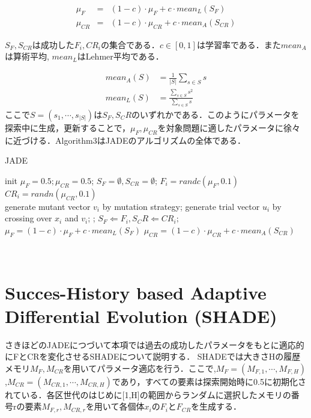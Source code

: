 \documentclass[a4paper,11pt,oneside,openany]{jsbook}
\begin{document}
\begin{eqnarray}
  \mu_F & = & (1 - c)\cdot\mu _F + c\cdot mean_L(S_F)\\
  \mu_{CR} & = & (1 - c)\cdot\mu _{CR} + c\cdot mean_A(S_{CR})
\end{eqnarray}

$S_F,S_{CR}$は成功した$F_i,CR_i$の集合である．$c\in[0,1]$は学習率である．また$mean_A$は算術平均, $mean_L$はLehmer平均である．

\begin{eqnarray}
  mean_A(S) & = \frac{1}{|S|}\sum_{s\in S}s \\
  mean_L(S) & = \frac{\sum_{s\in S}s^2}{\sum_{s\in S}s}
\end{eqnarray}
ここで$S=(s_1,\cdots, s_{|S|})$は$S_F,S_CR$のいずれかである．このようにパラメータを探索中に生成，更新することで，$\mu _F, \mu _{CR}$を対象問題に適したパラメータに徐々に近づける．Algorithm3はJADEのアルゴリズムの全体である．

\begin{algorithm}                      
\caption{JADE}         
\label{alg:pbnf}                          
\begin{algorithmic}  
\STATE init $\mu _F = 0.5; \mu _{CR} = 0.5$;
    \STATE $S_F = \emptyset, S_{CR} = \emptyset$;
        \STATE $F_i = randc(\mu _F, 0.1)$ \\
        \STATE $CR_i = randn(\mu _{CR}, 0.1)$ \\
        \STATE generate mutant vector {$v_i$} by mutation strategy;
        \STATE generate trial vector {$u_i$} by crossing over {$x_i$} and {$v_i$}; 
    \ENDFOR
            ;
            \STATE $S_F\Leftarrow {F_i}, S_CR \Leftarrow {CR_i};$
        \ENDIF
    \ENDFOR
        \STATE $\mu_F = (1 - c)\cdot\mu _F + c\cdot mean_L(S_F)$
        \STATE $\mu_{CR} = (1 - c)\cdot\mu _{CR} + c\cdot mean_A(S_{CR})$
    \ENDIF
\ENDWHILE
\end{algorithmic}
\end{algorithm}　

\section{Succes-History based Adaptive Differential Evolution (SHADE)}
さきほどのJADEにつづいて本項では過去の成功したパラメータをもとに適応的にFとCRを変化させるSHADEについて説明する．
SHADEでは大きさHの履歴メモリ$M_F,M_{CR}$を用いてパラメータ適応を行う．ここで,$M_F = (M_{F,1},\cdots,M_{F,H})$,$M_{CR}= (M_{CR,1},\cdots,M_{CR,H})$であり，すべての要素は探索開始時に0.5に初期化されている．各区世代のはじめに[1,H]の範囲からランダムに選択したメモリの番号rの要素$M_{F,r},M_{CR,r}$を用いて各個体$x_i$の$F_i$と$F_{CR}$を生成する．
\end{document}
